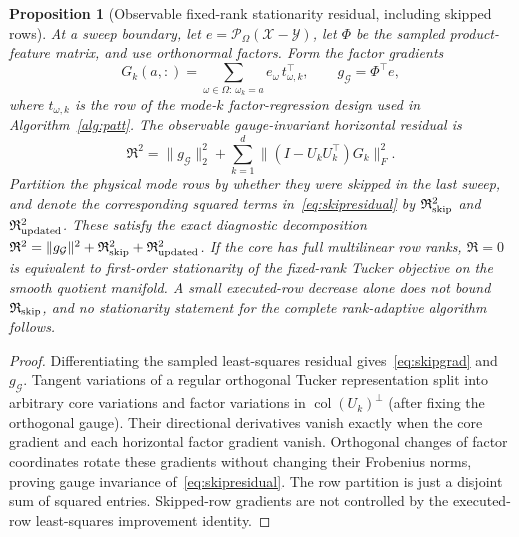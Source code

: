 \documentclass[review,10pt]{elsarticle}
\newtheorem{proposition}{Proposition}
\newcommand{\cX}{\mathcal X}
\newcommand{\cY}{\mathcal Y}
\newcommand{\cG}{\mathcal G}
\begin{document}
\begin{proposition}[Observable fixed-rank stationarity residual, including skipped rows]\label{prop:skipresidual}
At a sweep boundary, let $e=\mathcal P_\Omega(\cX-\cY)$, let $\Phi$ be the sampled product-feature matrix, and use orthonormal factors. Form the factor gradients
\begin{equation}\label{eq:skipgrad}
 G_k(a,:)=\sum_{\omega\in\Omega:\,\omega_k=a}e_\omega\,t_{\omega,k}^\top,
 \qquad g_{\cG}=\Phi^\top e,
\end{equation}
where $t_{\omega,k}$ is the row of the mode-$k$ factor-regression design used in Algorithm~\ref{alg:patt}. The observable gauge-invariant horizontal residual is
\begin{equation}\label{eq:skipresidual}
 \boxed{\mathfrak R^2=\|g_{\cG}\|_2^2+\sum_{k=1}^d\|(I-U_kU_k^\top)G_k\|_F^2.}
\end{equation}
Partition the physical mode rows by whether they were skipped in the last sweep, and denote the corresponding squared terms in~\eqref{eq:skipresidual} by $\mathfrak R_{\rm skip}^2$ and $\mathfrak R_{\rm updated}^2$. These satisfy the exact diagnostic decomposition $\mathfrak R^2=\|g_{\cG}\|^2+\mathfrak R_{\rm skip}^2+\mathfrak R_{\rm updated}^2$. If the core has full multilinear row ranks, $\mathfrak R=0$ is equivalent to first-order stationarity of the fixed-rank Tucker objective on the smooth quotient manifold. A small executed-row decrease alone does not bound $\mathfrak R_{\rm skip}$, and no stationarity statement for the complete rank-adaptive algorithm follows.
\end{proposition}
\begin{proof}
Differentiating the sampled least-squares residual gives~\eqref{eq:skipgrad} and $g_{\cG}$. Tangent variations of a regular orthogonal Tucker representation split into arbitrary core variations and factor variations in $\operatorname{col}(U_k)^\perp$ (after fixing the orthogonal gauge). Their directional derivatives vanish exactly when the core gradient and each horizontal factor gradient vanish. Orthogonal changes of factor coordinates rotate these gradients without changing their Frobenius norms, proving gauge invariance of~\eqref{eq:skipresidual}. The row partition is just a disjoint sum of squared entries. Skipped-row gradients are not controlled by the executed-row least-squares improvement identity.
\end{proof}
\end{document}
